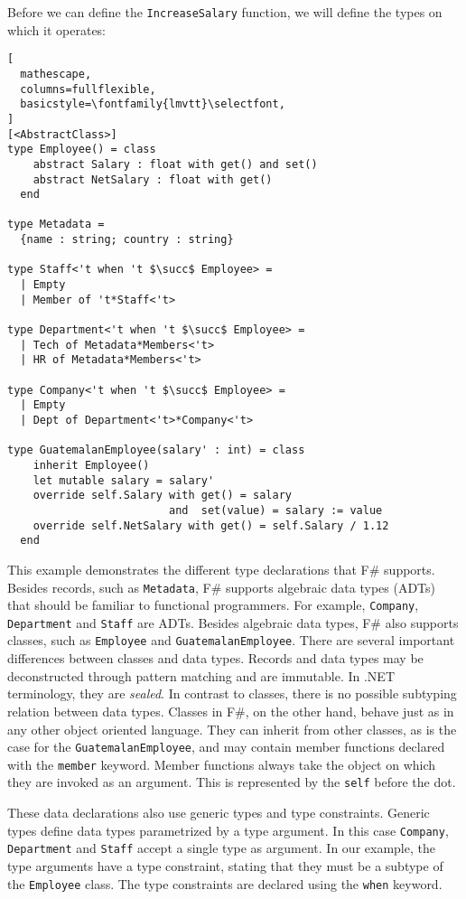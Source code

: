 \documentclass{sigplanconf}
\begin{document}
Before we can define the \verb+IncreaseSalary+ function, we will define the types on which it operates:
\begin{lstlisting}[
  mathescape,
  columns=fullflexible,
  basicstyle=\fontfamily{lmvtt}\selectfont,
]
[<AbstractClass>]
type Employee() = class
    abstract Salary : float with get() and set()
    abstract NetSalary : float with get()
  end

type Metadata = 
  {name : string; country : string}

type Staff<'t when 't $\succ$ Employee> =
  | Empty
  | Member of 't*Staff<'t>

type Department<'t when 't $\succ$ Employee> =
  | Tech of Metadata*Members<'t>
  | HR of Metadata*Members<'t>

type Company<'t when 't $\succ$ Employee> =
  | Empty
  | Dept of Department<'t>*Company<'t>

type GuatemalanEmployee(salary' : int) = class
    inherit Employee()
    let mutable salary = salary'
    override self.Salary with get() = salary
                         and  set(value) = salary := value
    override self.NetSalary with get() = self.Salary / 1.12
  end
\end{lstlisting}
This example demonstrates the different type declarations that F\# supports.
Besides records, such as \verb+Metadata+, F\# supports algebraic data types (ADTs)
that should be familiar to functional programmers. For example, \verb+Company+,
\verb+Department+ and \verb+Staff+ are ADTs. Besides algebraic data types,
F\# also supports classes, such as \verb+Employee+ and
\verb+GuatemalanEmployee+. There are several important differences between classes
and data types. Records and data types may be deconstructed through pattern matching 
and are immutable. In .NET terminology, they are \emph{sealed}. In contrast to classes,
there is no possible subtyping relation between data types.
Classes in F\#, on the other hand, 
behave just as in any other object oriented language. They can inherit from
other classes, as is the case for the \verb+GuatemalanEmployee+, and may contain
member functions declared with the \verb+member+ keyword. Member
functions always take the object on which they are
invoked as an argument. This is represented by the \verb+self+ before the dot.

These data declarations also use generic types and type
constraints. Generic types define data types parametrized by a type
argument.  In this case \verb+Company+, \verb+Department+ and
\verb+Staff+ accept a single type as argument. In our example, the
type arguments have a type constraint, stating that they must be a
subtype of the \verb+Employee+ class. The type constraints are
declared using the \verb+when+ keyword.
\end{document}
